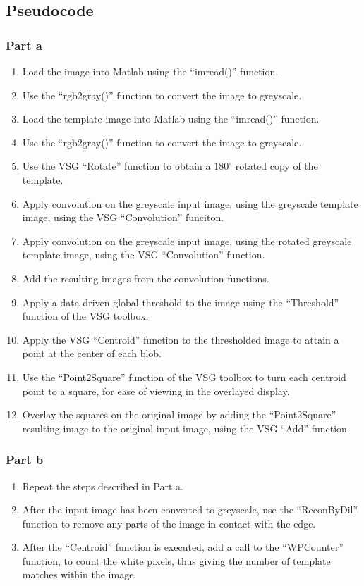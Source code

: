 \documentclass[a4paper]{article}
\begin{document}
	\subsection{Pseudocode}
	\subsubsection{Part a}
	\begin{enumerate}
		\item Load the image into Matlab using the ``imread()''
			function.
		\item Use the ``rgb2gray()'' function to convert the image to
			greyscale.
		\item Load the template image into Matlab using the ``imread()''
			function.
		\item Use the ``rgb2gray()'' function to convert the image to
			greyscale.
		\item Use the VSG ``Rotate'' function to obtain a $180^\circ$ rotated
			copy of the template.
		\item Apply convolution on the greyscale input image, using the
			greyscale template image, using the VSG ``Convolution''
			funciton.
		\item Apply convolution on the greyscale input image, using the
			rotated greyscale template image, using the VSG
			``Convolution'' function.
		\item Add the resulting images from the convolution functions.
		\item Apply a data driven global threshold to the image using
			the ``Threshold'' function of the VSG toolbox.
		\item Apply the VSG ``Centroid'' function to the thresholded
			image to attain a point at the center of each blob.
		\item Use the ``Point2Square'' function of the VSG toolbox to
			turn each centroid point to a square, for ease of
			viewing in the overlayed display.
		\item Overlay the squares on the original image by adding the
			``Point2Square'' resulting image to the original input
			image, using the VSG ``Add'' function.
	\end{enumerate}
	\subsubsection{Part b}
	\begin{enumerate}
		\item Repeat the steps described in Part a.
		\item After the input image has been converted to greyscale, use
			the ``ReconByDil'' function to remove any parts of the image
			in contact with the edge.
		\item After the ``Centroid'' function is executed, add a call to
			the ``WPCounter'' function, to count the white pixels,
			thus giving the number of template matches within the
			image.
	\end{enumerate}
\end{document}
